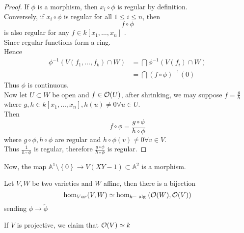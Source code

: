 \documentclass[../main.tex]{subfiles}
\begin{document}
\begin{proof}
If $\phi$ is a morphism, then $x_i\circ\phi$ is regular by definition.\\
Conversely, if $x_i\circ\phi$ is regular for all $1 \leq i \leq n$, then 
\[ 
f\circ\phi
\]
is also regular for any $f \in k [ x_1,\ldots,x_n] $ .\\
Since regular functions form a ring.\\
Hence 
\begin{align*}
	\phi^{-1}( V( f_1,\ldots,f_k) \cap W) &= \bigcap \phi^{-1}( V( f_i) \cap W) 			 \\
	&= \bigcap ( f\circ\phi) ^{-1}( 0) 
\end{align*}
Thus $\phi$ is continuous.\\
Now let $U \subset W$ be open and $f\in \mathcal{O}( U) $, after shrinking, we may suppose $f= \frac{g}{h}$ where $g,h \in k[x_1,\ldots,x_n], h( u) \neq 0 \forall u \in U$.\\
Then
\[ 
f\circ\phi = \frac{g\circ\phi}{h\circ\phi}
\]
where $g\circ\phi, h\circ\phi$ are regular and $h\circ\phi( v) \neq 0 \forall v\in V$.\\
Thus $ \frac{1}{h\circ\phi}$ is regular, therefore $ \frac{g\circ\phi}{h\circ\phi}$ is regular.
\end{proof}
\begin{exemple}
Now, the map $ \mathbb{A}^{1}\setminus \left\{ 0 \right\} \to V( XY-1) \subset \mathbb{A}^{2}$ is a morphism.
\end{exemple}
\begin{crly}
Let $V,W$ be two varieties and $W$ affine, then there is a bijection
\[ 
\hom_{ Var} ( V,W) \simeq \hom_{ k- \text{ alg } } ( \mathcal{O}( W) , \mathcal{O}( V) ) 
\]
sending $\phi \to \tilde\phi $ 
\end{crly}
\begin{rmq}
If $V$ is projective, we claim that $\mathcal{O}( V) \simeq k$ 
\end{rmq}
\end{document}
